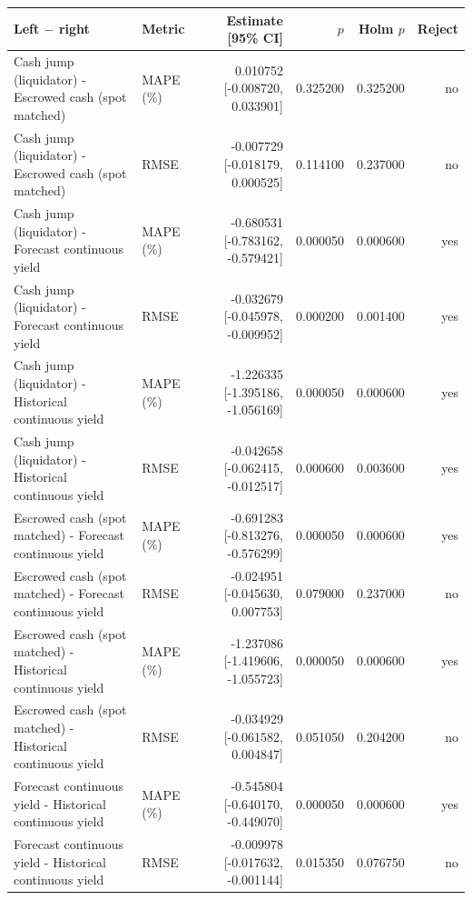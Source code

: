 \begin{tabular}{llrrrr}
\toprule
Left $-$ right & Metric & Estimate [95\% CI] & $p$ & Holm $p$ & Reject \\
\midrule
Cash jump (liquidator) - Escrowed cash (spot matched) & MAPE (\%) & 0.010752 [-0.008720, 0.033901] & 0.325200 & 0.325200 & no \\
Cash jump (liquidator) - Escrowed cash (spot matched) & RMSE & -0.007729 [-0.018179, 0.000525] & 0.114100 & 0.237000 & no \\
Cash jump (liquidator) - Forecast continuous yield & MAPE (\%) & -0.680531 [-0.783162, -0.579421] & 0.000050 & 0.000600 & yes \\
Cash jump (liquidator) - Forecast continuous yield & RMSE & -0.032679 [-0.045978, -0.009952] & 0.000200 & 0.001400 & yes \\
Cash jump (liquidator) - Historical continuous yield & MAPE (\%) & -1.226335 [-1.395186, -1.056169] & 0.000050 & 0.000600 & yes \\
Cash jump (liquidator) - Historical continuous yield & RMSE & -0.042658 [-0.062415, -0.012517] & 0.000600 & 0.003600 & yes \\
Escrowed cash (spot matched) - Forecast continuous yield & MAPE (\%) & -0.691283 [-0.813276, -0.576299] & 0.000050 & 0.000600 & yes \\
Escrowed cash (spot matched) - Forecast continuous yield & RMSE & -0.024951 [-0.045630, 0.007753] & 0.079000 & 0.237000 & no \\
Escrowed cash (spot matched) - Historical continuous yield & MAPE (\%) & -1.237086 [-1.419606, -1.055723] & 0.000050 & 0.000600 & yes \\
Escrowed cash (spot matched) - Historical continuous yield & RMSE & -0.034929 [-0.061582, 0.004847] & 0.051050 & 0.204200 & no \\
Forecast continuous yield - Historical continuous yield & MAPE (\%) & -0.545804 [-0.640170, -0.449070] & 0.000050 & 0.000600 & yes \\
Forecast continuous yield - Historical continuous yield & RMSE & -0.009978 [-0.017632, -0.001144] & 0.015350 & 0.076750 & no \\
\bottomrule
\end{tabular}
